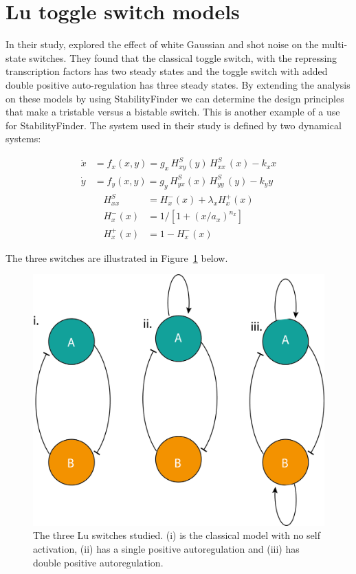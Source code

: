 \section{Lu toggle switch models}
In their study, \cite{Lu:2013br} explored the effect of white Gaussian and shot noise on the multi-state switches. They found that the classical toggle switch, with the repressing transcription factors has two steady states and the toggle switch with added double positive auto-regulation has three steady states. By extending the analysis on these models by using StabilityFinder we can determine the design principles that make a tristable versus a bistable switch. This is another example of a use for StabilityFinder.
The system used in their study is defined by two dynamical systems:

\begin{align}
\dot{x} &= f_{x}(x,y) =g_{x}\, H^{S}_{xy}(y)\, H^{S}_{xx}\,(x)-k_{x}x \label{eq:lu_both_1} \\
\dot{y} &= f_{y}(x,y) =g_{y}\,H^{S}_{yx}(x)\,H^{S}_{yy}\,(y)-k_{y}y \label{eq:lu_both_2}
\end{align}
\begin{align}
H^{S}_{xx} &= H^{-}_{x}(x)+\lambda_{x}H^{+}_{x}(x)\label{eq:lu_hsxx}\\
H^{-}_{x}(x) &= 1 \big/\left[1+(x/a_{x})^{n_{x}}\right]\label{eq:lu_hpx}\\
H^{+}_{x}(x) &= 1-H^{-}_{x}(x)\label{eq:lu_hmx}
\end{align}

The three switches are illustrated in Figure~\ref{fig:lu_sketch} below. 


\begin{figure}[htbp]
\centering
\includegraphics[scale=0.5]{chapterModelling/Lu_switches/images/lu_three_switches_sketch.png}
\caption[Lu switches]{The three Lu switches studied. (i) is the classical model with no self activation, (ii) has a single positive autoregulation and (iii) has double positive autoregulation. }
\label{fig:lu_sketch}
\end{figure}


